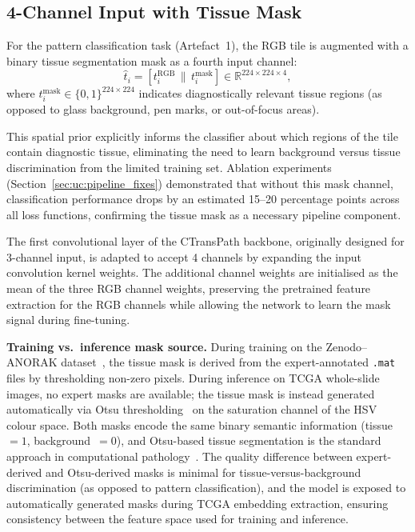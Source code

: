 \subsection{4-Channel Input with Tissue Mask}
\label{sec:meth:mask_channel}

For the pattern classification task (Artefact~1), the RGB tile is augmented with a binary tissue segmentation mask as a fourth input channel:
\begin{equation}
\label{eq:4channel}
\hat{t}_i = [t_i^{\text{RGB}} \,\|\, t_i^{\text{mask}}] \in \mathbb{R}^{224 \times 224 \times 4},
\end{equation}
where $t_i^{\text{mask}} \in \{0, 1\}^{224 \times 224}$ indicates diagnostically relevant tissue regions (as opposed to glass background, pen marks, or out-of-focus areas).

This spatial prior explicitly informs the classifier about which regions of the tile contain diagnostic tissue, eliminating the need to learn background versus tissue discrimination from the limited training set.
Ablation experiments (Section~\ref{sec:uc:pipeline_fixes}) demonstrated that without this mask channel, classification performance drops by an estimated 15--20 percentage points across all loss functions, confirming the tissue mask as a necessary pipeline component.

The first convolutional layer of the CTransPath backbone, originally designed for 3-channel input, is adapted to accept 4 channels by expanding the input convolution kernel weights.
The additional channel weights are initialised as the mean of the three RGB channel weights, preserving the pretrained feature extraction for the RGB channels while allowing the network to learn the mask signal during fine-tuning.

\textbf{Training vs.\ inference mask source.}
During training on the Zenodo--ANORAK dataset~\cite{anorak2024}, the
tissue mask is derived from the expert-annotated \texttt{.mat} files
by thresholding non-zero pixels.
During inference on TCGA whole-slide images, no expert masks are
available; the tissue mask is instead generated automatically via
Otsu thresholding~\cite{otsu1979threshold} on the saturation channel
of the HSV colour space.
Both masks encode the same binary semantic information
(tissue~$= 1$, background~$= 0$), and Otsu-based tissue
segmentation is the standard approach in computational
pathology~\cite{janowczyk2016deep}.
The quality difference between expert-derived and Otsu-derived masks
is minimal for tissue-versus-background discrimination (as opposed
to pattern classification), and the model is exposed to automatically
generated masks during TCGA embedding extraction, ensuring
consistency between the feature space used for training and inference.



